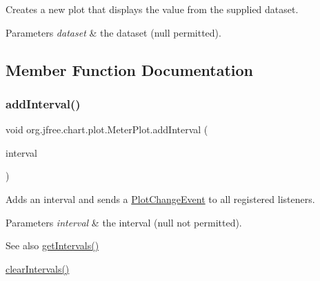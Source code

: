 Creates a new plot that displays the value from the supplied dataset.


\begin{DoxyParams}{Parameters}
{\em dataset} & the dataset ({\ttfamily null} permitted). \\
\hline
\end{DoxyParams}


\subsection{Member Function Documentation}
\mbox{\label{classorg_1_1jfree_1_1chart_1_1plot_1_1_meter_plot_ab60286f0f485696e89b642d0bcad3c83}} 
\subsubsection{\texorpdfstring{add\+Interval()}{addInterval()}}
{\footnotesize\ttfamily void org.\+jfree.\+chart.\+plot.\+Meter\+Plot.\+add\+Interval (\begin{DoxyParamCaption}\item[{\mbox{\hyperlink{classorg_1_1jfree_1_1chart_1_1plot_1_1_meter_interval}{Meter\+Interval}}}]{interval }\end{DoxyParamCaption})}

Adds an interval and sends a \mbox{\hyperlink{}{Plot\+Change\+Event}} to all registered listeners.


\begin{DoxyParams}{Parameters}
{\em interval} & the interval ({\ttfamily null} not permitted).\\
\hline
\end{DoxyParams}
\begin{DoxySeeAlso}{See also}
\mbox{\hyperlink{classorg_1_1jfree_1_1chart_1_1plot_1_1_meter_plot_a1b0919aaa6783b57c61ab7c8868b87d9}{get\+Intervals()}} 

\mbox{\hyperlink{classorg_1_1jfree_1_1chart_1_1plot_1_1_meter_plot_a70717186b8caeec6c73813bd9a1a0fd2}{clear\+Intervals()}} 
\end{DoxySeeAlso}
\mbox{\label{classorg_1_1jfree_1_1chart_1_1plot_1_1_meter_plot_a70717186b8caeec6c73813bd9a1a0fd2}} 

